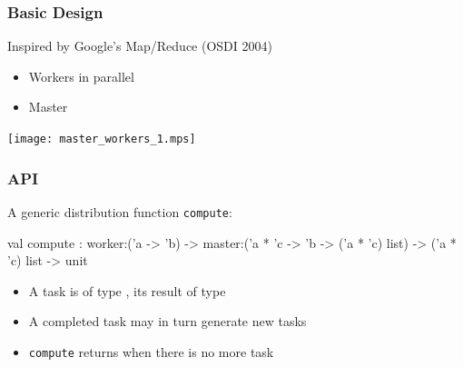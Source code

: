 \documentclass[xcolor=dvipsnames,8pt]{beamer}
\begin{document}

\begin{frame}\frametitle {Basic Design}

Inspired by Google's Map/Reduce (OSDI 2004)

\begin{itemize}
\item Workers in parallel
\item Master
\end{itemize}

\begin{center}
  \texttt{[image: master\_workers\_1.mps]}  
\end{center}
\end{frame}


\begin{frame}\frametitle {API}
A generic distribution function \texttt{compute}:\\
  \begin{ocaml}
    val compute : 
    worker:('a -> 'b) -> 
    master:('a * 'c -> 'b -> ('a * 'c) list) -> 
    ('a * 'c) list -> 
    unit
  \end{ocaml}
  \begin{itemize}
  \item A task is of type , its result of type
  \item A completed task may in turn generate new tasks
  \item \texttt{compute} returns when there is no more task
  \end{itemize}
\end{frame}

\end{document}
